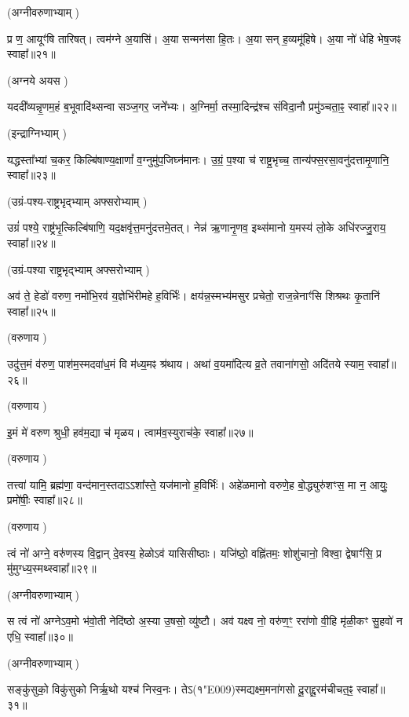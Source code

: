 (अग्नीवरुणाभ्याम् \idam)

प्र ण॒ आयूꣳ॑षि तारिषत्।
त्वम॑ग्ने अ॒यासि॑।
अ॒या सन्मन॑सा हि॒तः।
अ॒या सन् ह॒व्यमू॑हिषे।
अ॒या नो॑ धेहि भेष॒जꣴ स्वाहा᳚॥२१॥

(अग्नये अयस \idam)


यददी᳚व्यन्नृ॒णम॒हं ब॒भूवादि॑थ्सन्वा सञ्ज॒गर॒ जने᳚भ्यः। 
अ॒ग्निर्मा॒ तस्मा॒दिन्द्र॑श्च संविदा॒नौ प्रमु॑ञ्चता॒ꣴ॒ स्वाहा᳚॥२२॥

(इन्द्राग्निभ्याम् \idam)

यद्धस्ता᳚भ्यां च॒कर॒ किल्बि॑षाण्य॒क्षाणां᳚ व॒ग्नुमु॑प॒जिघ्न॑मानः। 
उ॒ग्रं॒ प॒श्या च॑ राष्ट्र॒भृच्च॒ तान्य॑फ्स॒रसा॒वनु॑दत्तामृ॒णानि॒ स्वाहा᳚॥२३॥

(उग्रं-पश्य-राष्ट्रभृद्भ्याम् अफ्सरोभ्याम् \idam)


उग्रं॑ पश्ये॒ राष्ट्र॑भृ॒त्किल्बि॑षाणि॒ यद॒क्षवृ॑त्त॒मनु॑दत्तमे॒तत्। 
नेन्न॑ ऋ॒णानृ॒णव॒ इथ्स॑मानो य॒मस्य॑ लो॒के अधि॑रज्जु॒राय॒ स्वाहा᳚॥२४॥

(उग्रं-पश्या राष्ट्रभृद्भ्याम् अफ्सरोभ्याम् \idam)


अव॑ ते॒ हेडो॑ वरुण॒ नमो॑\-भि॒रव॑ य॒ज्ञेभि॑रीमहे ह॒विर्भिः॑।
क्षय॑न्न॒स्मभ्य॑मसुर प्रचेतो॒ राज॒न्नेनाꣳ॑सि शिश्रथः कृ॒तानि॑ स्वाहा᳚॥२५॥

(वरुणाय \idam)


उदु॑त्त॒मं व॑रुण॒ पाश॑\-म॒स्मद\-वा॑ध॒मं वि म॑ध्य॒मꣴ श्र॑थाय।
अथा॑ व॒यमा॑दित्य व्र॒ते तवाना॑गसो॒ अदि॑तये स्याम॒ स्वाहा᳚॥२६॥

(वरुणाय \idam)


इ॒मं मे॑ वरुण श्रुधी॒ हव॑म॒द्या च॑ मृळय। त्वाम॑व॒स्युराच॑के॒ स्वाहा᳚॥२७॥

(वरुणाय \idam)

तत्त्वा॑ यामि॒ ब्रह्म॑णा॒ वन्द॑मान॒स्तदाऽऽशा᳚स्ते॒ यज॑मानो ह॒विर्भिः॑।
अहे॑ळमानो वरुणे॒ह बो॒द्ध्युरु॑शꣳस॒ मा न॒ आयुः॒ प्रमो॑षीः॒ स्वाहा᳚॥२८॥

(वरुणाय \idam)



त्वं नो॑ अग्ने॒ वरु॑णस्य वि॒द्वान् दे॒वस्य॒ हेळो\-ऽव॑ यासिसीष्ठाः।
यजि॑ष्ठो॒ वह्नि॑तमः॒ शोशु॑चानो॒ विश्वा॒ द्वेषाꣳ॑सि॒ प्र मु॑मुग्ध्य॒स्मथ्स्वाहा᳚॥२९॥

(अग्नीवरुणाभ्याम् \idam)



स त्वं नो॑ अग्ने\-ऽव॒मो भ॑वो॒ती नेदि॑ष्ठो अ॒स्या उ॒षसो॒ व्यु॑ष्टौ।
अव॑ यक्ष्व नो॒ वरु॑ण॒ꣳ॒ ररा॑णो वी॒हि मृ॑ळी॒कꣳ सु॒हवो॑ न एधि॒ स्वाहा᳚॥३०॥

(अग्नीवरुणाभ्याम् \idam)


सङ्कु॑सुको॒ विकु॑सुको निर्\mbox{}ऋ॒थो यश्च॑ निस्व॒नः। 
तेऽ(१\char"E009)स्मद्यक्ष्म॒मना॑\-गसो दू॒राद्दू॒रम॑चीचत॒ꣴ॒ स्वाहा᳚॥३१॥


